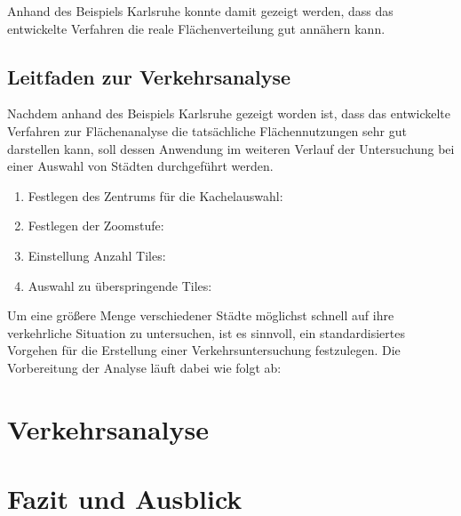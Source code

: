 \documentclass[12pt,a4paper]{scrartcl}
\begin{document}
Anhand des Beispiels Karlsruhe konnte damit gezeigt werden, dass das entwickelte Verfahren die reale Flächenverteilung gut annähern kann. 

\subsection{Leitfaden zur Verkehrsanalyse}
Nachdem anhand des Beispiels Karlsruhe gezeigt worden ist, dass das entwickelte Verfahren zur Flächenanalyse die tatsächliche Flächennutzungen sehr gut darstellen kann, soll dessen Anwendung im weiteren Verlauf der Untersuchung bei einer Auswahl von Städten durchgeführt werden.
\begin{enumerate}
\item Festlegen des Zentrums für die Kachelauswahl:
\item Festlegen der Zoomstufe:
\item Einstellung Anzahl Tiles:
\item Auswahl zu überspringende Tiles:
\end{enumerate}


Um eine größere Menge verschiedener Städte möglichst schnell auf ihre verkehrliche Situation zu untersuchen, ist es sinnvoll, ein standardisiertes Vorgehen für die Erstellung einer Verkehrsuntersuchung festzulegen. Die Vorbereitung der Analyse läuft dabei wie folgt ab:

\newpage
\section{Verkehrsanalyse}


\newpage
\section{Fazit und Ausblick}
\end{document}
